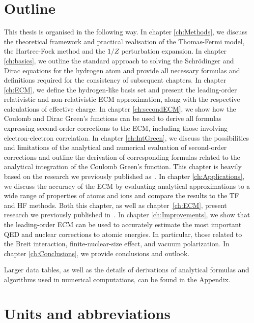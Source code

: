 \section{Outline}

This thesis is organised in the following way. In chapter \ref{ch:Methods}, we discuss the theoretical framework and practical realisation of the Thomas-Fermi model, the Hartree-Fock method and the $1/Z$ perturbation expansion. In chapter \ref{ch:basics}, we outline the standard approach to solving the Schr\"odinger and Dirac equations for the hydrogen atom and provide all necessary formulas and definitions required for the consistency of subsequent chapters. In chapter \ref{ch:ECM}, we define the hydrogen-like basis set and present the leading-order relativistic and non-relativistic ECM approximation, along with the respective calculations of effective charge. In chapter \ref{ch:secondECM}, we show how the Coulomb and Dirac Green's functions can be used to derive all formulas expressing second-order corrections to the ECM, including those involving electron-electron correlation. In chapter \ref{ch:IntGreen}, we discuss the possibilities and limitations of the analytical and numerical evaluation of second-order corrections and outline the derivation of corresponding formulas related to the analytical integration of the Coulomb Green's function. This chapter is heavily based on the research we previously published as~\cite{Dzikowski_2020}. In chapter \ref{ch:Applications}, we discuss the accuracy of the ECM by evaluating analytical approximations to a wide range of properties of atoms and ions and compare the results to the TF and HF methods. Both this chapter, as well as chapter~\ref{ch:ECM}, present research we previously published in~\cite{Dzikowski_2021}. In chapter \ref{ch:Improvements}, we show that the leading-order ECM can be used to accurately estimate the most important QED and nuclear corrections to atomic energies. In particular, those related to the Breit interaction, finite-nuclear-size effect, and vacuum polarization. In chapter \ref{ch:Conclusions}, we provide conclusions and outlook.

Larger data tables, as well as the details of derivations of analytical formulas and algorithms used in numerical computations, can be found in the Appendix.

\section{Units and abbreviations}

